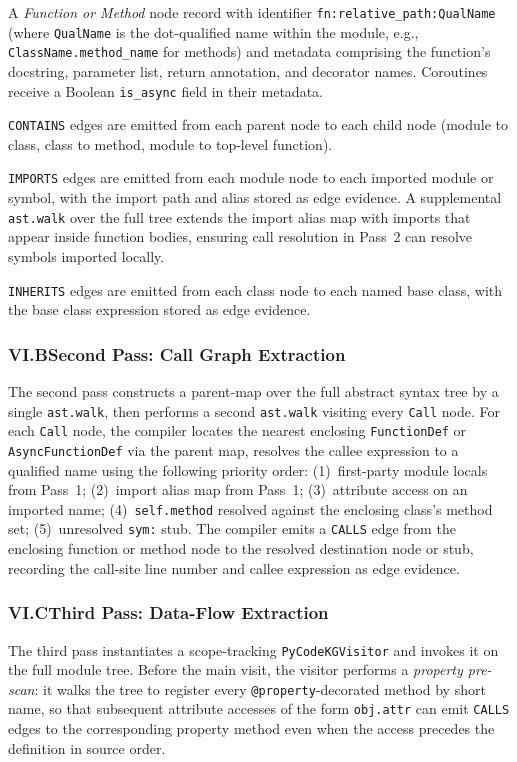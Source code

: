\documentclass[12pt]{article}
\begin{document}
A \emph{Function or Method} node record with identifier
\texttt{fn:relative\_path:QualName} (where \texttt{QualName} is the
dot-qualified name within the module, e.g., \texttt{ClassName.method\_name} for
methods) and metadata comprising the function's docstring, parameter list, return
annotation, and decorator names. Coroutines receive a Boolean \texttt{is\_async}
field in their metadata.

\texttt{CONTAINS} edges are emitted from each parent node to each child node
(module to class, class to method, module to top-level function).

\texttt{IMPORTS} edges are emitted from each module node to each imported module
or symbol, with the import path and alias stored as edge evidence. A supplemental
\texttt{ast.walk} over the full tree extends the import alias map with imports
that appear inside function bodies, ensuring call resolution in Pass~2 can
resolve symbols imported locally.

\texttt{INHERITS} edges are emitted from each class node to each named base
class, with the base class expression stored as edge evidence.

\subsubsection{VI.B\quad Second Pass: Call Graph Extraction}

The second pass constructs a parent-map over the full abstract syntax tree by a
single \texttt{ast.walk}, then performs a second \texttt{ast.walk} visiting
every \texttt{Call} node. For each \texttt{Call} node, the compiler locates the
nearest enclosing \texttt{FunctionDef} or \texttt{AsyncFunctionDef} via the
parent map, resolves the callee expression to a qualified name using the
following priority order: (1)~first-party module locals from Pass~1; (2)~import
alias map from Pass~1; (3)~attribute access on an imported name;
(4)~\texttt{self.method} resolved against the enclosing class's method set;
(5)~unresolved \texttt{sym:} stub. The compiler emits a \texttt{CALLS} edge
from the enclosing function or method node to the resolved destination node or
stub, recording the call-site line number and callee expression as edge evidence.

\subsubsection{VI.C\quad Third Pass: Data-Flow Extraction}

The third pass instantiates a scope-tracking \texttt{PyCodeKGVisitor} and
invokes it on the full module tree. Before the main visit, the visitor performs
a \emph{property pre-scan}: it walks the tree to register every
\texttt{@property}-decorated method by short name, so that subsequent attribute
accesses of the form \texttt{obj.attr} can emit \texttt{CALLS} edges to the
corresponding property method even when the access precedes the definition in
source order.
\end{document}
